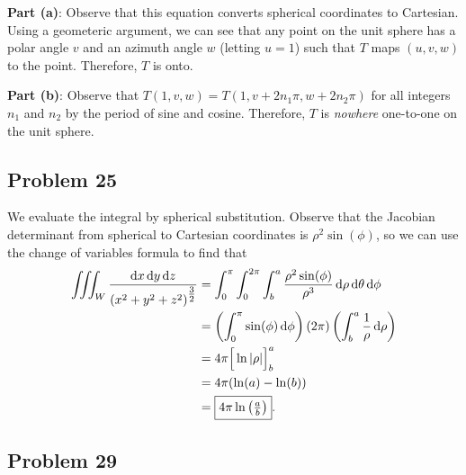 \documentclass[11pt]{article}
\begin{document}
\textbf{Part (a)}: Observe that this equation converts spherical coordinates to Cartesian. Using a geometeric argument, we can see that any point on the unit sphere has a polar angle $v$ and an azimuth angle $w$ (letting $u = 1$) such that $T$ maps $(u, v, w)$ to the point. Therefore, $T$ is onto.

\textbf{Part (b)}: Observe that $T(1, v, w) = T(1, v + 2n_{1} \pi, w + 2n_{2} \pi)$ for all integers $n_{1}$ and $n_{2}$ by the period of sine and cosine. Therefore, $T$ is \textit{nowhere} one-to-one on the unit sphere.


\subsection*{Problem 25}

We evaluate the integral by spherical substitution. Observe that the Jacobian determinant from spherical to Cartesian coordinates is $\rho^{2} \sin(\phi)$, so we can use the change of variables formula to find that
\begin{align*}
	\iiint_{W} \frac{\dd{x} \dd{y} \dd{z}}{\left( x^{2} + y^{2} + z^{2} \right)^{\tfrac{3}{2}}} &= \int_{0}^{\pi} \int_{0}^{2\pi} \int_{b}^{a} \frac{\rho^{2} \sin(\phi)}{\rho^{3}} \dd{\rho} \dd{\theta} \dd{\phi} \\
	&= \left( \int_{0}^{\pi} \sin(\phi) \dd{\phi} \right) \left( 2\pi \right) \left( \int_{b}^{a} \frac{1}{\rho} \dd{\rho}  \right) \\
	&= 4\pi \Big[ \ln \abs{\rho} \Big]_{b}^{a} \\
	&= 4\pi (\ln(a) - \ln(b)) \\
	&= \boxed{4\pi\ln \left( \tfrac{a}{b} \right)}.
\end{align*}


\subsection*{Problem 29}
\end{document}
